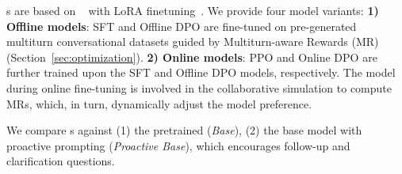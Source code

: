 


  \name{}s are based on \llama{}~\citep{metallama} with LoRA finetuning~\citep{lora}. We provide four model variants: \textbf{1) Offline models}: SFT and Offline DPO are fine-tuned on pre-generated multiturn conversational datasets guided by Multiturn-aware Rewards (MR) (\cf Section~\ref{sec:optimization}). \textbf{2) Online models}: PPO and Online DPO are further trained upon the SFT and Offline DPO models, respectively. The model during online fine-tuning is involved in the collaborative simulation to compute MRs, which, in turn, dynamically adjust the model preference. 




 We compare \name{}s against (1) the pretrained \llama (\textit{Base}), (2) the base model with proactive prompting (\textit{Proactive Base}), which encourages follow-up and clarification questions. 



